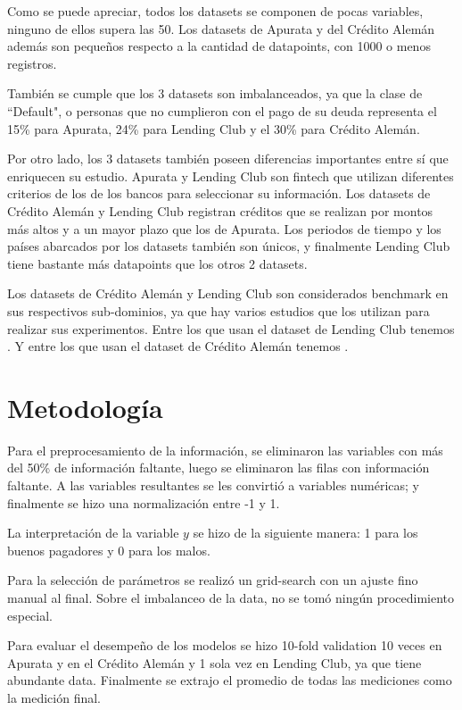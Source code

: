 Como se puede apreciar, todos los datasets se componen de pocas variables, ninguno de ellos supera las 50. Los datasets de Apurata y del Crédito Alemán además son pequeños respecto a la cantidad de datapoints, con 1000 o menos registros.

También se cumple que los 3 datasets son imbalanceados, ya que la clase de ``Default", o personas que no cumplieron con el pago de su deuda representa el 15\% para Apurata, 24\% para Lending Club y el 30\% para Crédito Alemán.

Por otro lado, los 3 datasets también poseen diferencias importantes entre sí que enriquecen su estudio. Apurata y Lending Club son fintech que utilizan diferentes criterios de los de los bancos para seleccionar su información. Los datasets de Crédito Alemán y Lending Club registran créditos que se realizan por montos más altos y a un mayor plazo que los de Apurata. Los periodos de tiempo y los países abarcados por los datasets también son únicos, y finalmente Lending Club tiene bastante más datapoints que los otros 2 datasets.

Los datasets de Crédito Alemán y Lending Club son considerados benchmark en sus respectivos sub-dominios, ya que hay varios estudios que los utilizan para realizar sus experimentos. Entre los que usan el dataset de Lending Club tenemos \cite{malekipirbazari2015risk, zhang2016research, zang2014credit, tan2018deep}. Y entre los que usan el dataset de Crédito Alemán tenemos \cite{harris2015credit, nanni2009experimental, brown2012experimental, wang2012two}.

\section{Metodología}

Para el preprocesamiento de la información, se eliminaron las variables con más del 50\% de información faltante, luego se eliminaron las filas con información faltante. A las variables resultantes se les convirtió a variables numéricas; y finalmente se hizo una normalización entre -1 y 1.

La interpretación de la variable $y$ se hizo de la siguiente manera: 1 para los buenos pagadores y 0 para los malos.

Para la selección de parámetros se realizó un grid-search con un ajuste fino manual al final. Sobre el imbalanceo de la data, no se tomó ningún procedimiento especial. 

Para evaluar el desempeño de los modelos se hizo 10-fold validation 10 veces en Apurata y en el Crédito Alemán y 1 sola vez en Lending Club, ya que tiene abundante data. Finalmente se extrajo el promedio de todas las mediciones como la medición final. 

